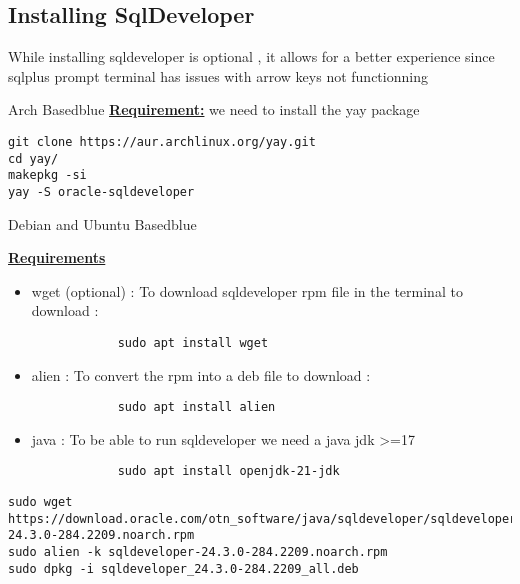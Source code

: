 \documentclass{article}
\begin{document}
\vspace{0.25cm}
\subsection{Installing SqlDeveloper}
While installing sqldeveloper is optional , it allows for a better experience since sqlplus prompt terminal
has issues with arrow keys not functionning

\begin{prettyBox}{Arch Based}{blue}
\textbf{\underline{Requirement:}} we need to install the yay package 

    \begin{verbatim}
git clone https://aur.archlinux.org/yay.git
cd yay/
makepkg -si
yay -S oracle-sqldeveloper
    \end{verbatim}
\end{prettyBox}

\vspace{0.5cm}
\begin{prettyBox}{Debian and Ubuntu Based}{blue}


\vspace{0.25cm}
\textbf{\underline{Requirements}}

\begin{itemize}
    \item wget (optional) : To download sqldeveloper rpm file in the terminal to download : 
        \begin{verbatim}
            sudo apt install wget
        \end{verbatim}
    \item alien : To convert the rpm into a deb file to download : 
        \begin{verbatim}
            sudo apt install alien
        \end{verbatim}
    \item java : To be able to run sqldeveloper we need a java jdk \textgreater=17
        \begin{verbatim}
            sudo apt install openjdk-21-jdk
        \end{verbatim}
\end{itemize}
\begin{verbatim}
sudo wget https://download.oracle.com/otn_software/java/sqldeveloper/sqldeveloper-24.3.0-284.2209.noarch.rpm
sudo alien -k sqldeveloper-24.3.0-284.2209.noarch.rpm
sudo dpkg -i sqldeveloper_24.3.0-284.2209_all.deb 
\end{verbatim}

\end{prettyBox}
\end{document}
